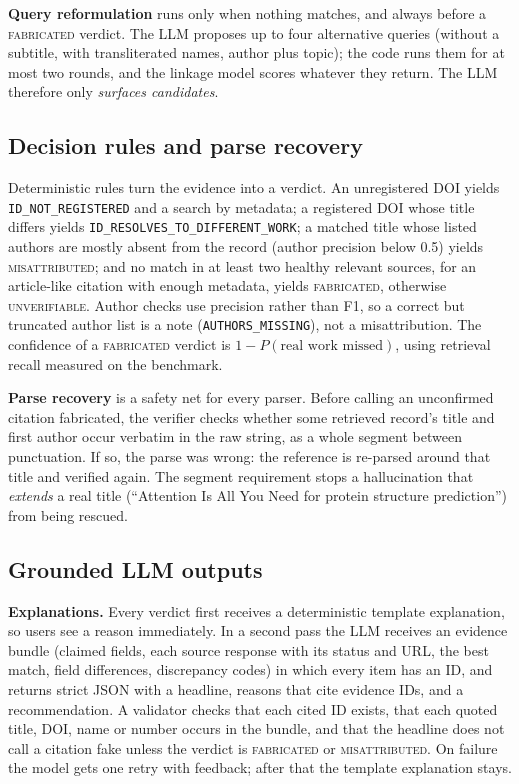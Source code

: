 \documentclass[10pt,twocolumn,a4paper]{article}
\newcommand{\verdict}[1]{\textsc{\MakeLowercase{#1}}}
\newcommand{\code}[1]{\texttt{\small #1}}
\begin{document}
\textbf{Query reformulation} runs only when nothing matches, and always before a
\verdict{FABRICATED} verdict. The LLM proposes up to four alternative queries (without a subtitle,
with transliterated names, author plus topic); the code runs them for at most two rounds, and the
linkage model scores whatever they return. The LLM therefore only \emph{surfaces candidates}.

\subsection{Decision rules and parse recovery}
Deterministic rules turn the evidence into a verdict. An unregistered DOI yields
\code{ID\_NOT\_REGISTERED} and a search by metadata; a registered DOI whose title differs yields
\code{ID\_RESOLVES\_TO\_DIFFERENT\_WORK}; a matched title whose listed authors are mostly absent from
the record (author precision below 0.5) yields \verdict{MISATTRIBUTED}; and no match in at least two
healthy relevant sources, for an article-like citation with enough metadata, yields
\verdict{FABRICATED}, otherwise \verdict{UNVERIFIABLE}. Author checks use precision rather than F1, so
a correct but truncated author list is a note (\code{AUTHORS\_MISSING}), not a misattribution. The
confidence of a \verdict{FABRICATED} verdict is $1-P(\text{real work missed})$, using retrieval
recall measured on the benchmark.

\textbf{Parse recovery} is a safety net for every parser. Before calling an unconfirmed citation
fabricated, the verifier checks whether some retrieved record's title and first author occur
verbatim in the raw string, as a whole segment between punctuation. If so, the parse was wrong: the
reference is re-parsed around that title and verified again. The segment requirement stops a
hallucination that \emph{extends} a real title (``Attention Is All You Need for protein structure
prediction'') from being rescued.

\subsection{Grounded LLM outputs}
\textbf{Explanations.} Every verdict first receives a deterministic template explanation, so users
see a reason immediately. In a second pass the LLM receives an evidence bundle (claimed fields, each
source response with its status and URL, the best match, field differences, discrepancy codes) in
which every item has an ID, and returns strict JSON with a headline, reasons that cite evidence IDs,
and a recommendation. A validator checks that each cited ID exists, that each quoted title, DOI,
name or number occurs in the bundle, and that the headline does not call a citation fake unless the
verdict is \verdict{FABRICATED} or \verdict{MISATTRIBUTED}. On failure the model gets one retry with
feedback; after that the template explanation stays.
\end{document}
